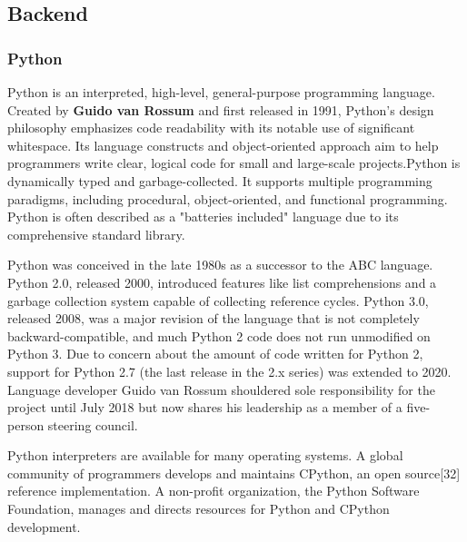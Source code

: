 \subsection{Backend}
\subsubsection{Python}
Python is an interpreted, high-level, general-purpose programming language. Created by \textbf{Guido van
Rossum} and first released in 1991, Python's design philosophy emphasizes code readability with its
notable use of significant whitespace. Its language constructs and object-oriented approach aim to
help programmers write clear, logical code for small and large-scale projects.Python is dynamically
typed and garbage-collected. It supports multiple programming paradigms, including procedural,
object-oriented, and functional programming. Python is often described as a "batteries included"
language due to its comprehensive standard library.
\par Python was conceived in the late 1980s as a successor to the ABC language. Python 2.0, released
2000, introduced features like list comprehensions and a garbage collection system capable of
collecting reference cycles. Python 3.0, released 2008, was a major revision of the language that is
not completely backward-compatible, and much Python 2 code does not run unmodified on Python
3. Due to concern about the amount of code written for Python 2, support for Python 2.7 (the last
release in the 2.x series) was extended to 2020. Language developer Guido van Rossum shouldered
sole responsibility for the project until July 2018 but now shares his leadership as a member of a
five-person steering council.
\par Python interpreters are available for many operating systems. A global community of programmers
develops and maintains CPython, an open source[32] reference implementation. A non-profit
organization, the Python Software Foundation, manages and directs resources for Python and
CPython development.

